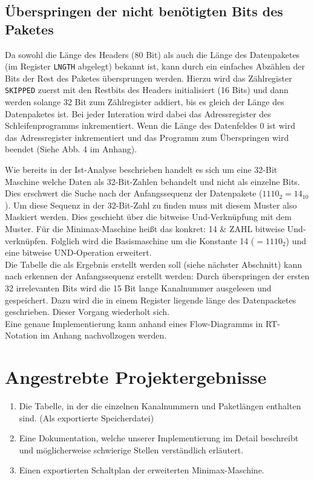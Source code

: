 \documentclass[12pt,titlepage]{article}
\begin{document}
\subsection{Überspringen der nicht benötigten Bits des Paketes}
Da sowohl die Länge des Headers (80 Bit) als auch die Länge des Datenpaketes (im Register \texttt{LNGTH} abgelegt) bekannt ist, kann durch
ein einfaches Abzählen der Bits der Rest des Paketes übersprungen werden. Hierzu wird das Zählregister \texttt{SKIPPED} zuerst mit den Restbits
des Headers initialisiert (16 Bits) und dann werden solange 32 Bit zum Zählregister addiert, bis es gleich der Länge des Datenpaketes ist. Bei
jeder Interation wird dabei das Adressregister des Schleifenprogramms inkrementiert. Wenn die Länge des Datenfeldes 0 ist wird das Adressregister
inkrementiert und das Programm zum Überspringen wird beendet (Siehe Abb. 4 im Anhang).

Wie bereits in der Ist-Analyse beschrieben handelt es sich um eine 32-Bit Maschine welche Daten als 32-Bit-Zahlen behandelt und nicht als 
einzelne Bits. Dies erschwert die Suche nach der Anfangssequenz der Datenpakete ($1110_{2} = 14_{10}$). Um diese Sequenz in der 32-Bit-Zahl
zu finden muss mit diesem Muster also Maskiert werden. Dies geschieht {\"u}ber die bitweise Und-Verkn{\"u}pfung mit dem Muster. F{\"u}r die Minimax-Maschine
heißt das konkret: 14 \& ZAHL bitweise Und-verkn{\"u}pfen. Folglich wird die Basismaschine um die Konstante 14 ($=1110_{2}$) und eine bitweise UND-Operation
erweitert.\\
Die Tabelle die als Ergebnis erstellt werden soll (siehe n{\"a}chster Abschnitt) kann nach erkennen der Anfangssequenz erstellt werden:
Durch {\"u}berspringen der ersten 32 irrelevanten Bits wird die 15 Bit lange Kanalnummer ausgelesen und gespeichert. Dazu wird die in einem Register liegende l{\"a}nge des Datenpacketes geschrieben. Dieser Vorgang wiederholt sich.\\
Eine genaue Implementierung kann anhand eines Flow-Diagramms in RT-Notation im Anhang nachvollzogen werden.


\section{Angestrebte Projektergebnisse}
\begin{enumerate}
\item Die Tabelle, in der die einzelnen Kanalnummern und Paketl{\"a}ngen enthalten sind. (Als exportierte Speicherdatei)
\item Eine Dokumentation, welche unserer Implementierung im Detail beschreibt und m{\"o}glicherweise schwierige Stellen verst{\"a}ndlich erl{\"a}utert.
\item Einen exportierten Schaltplan der erweiterten Minimax-Maschine.
\end{enumerate}
\end{document}
